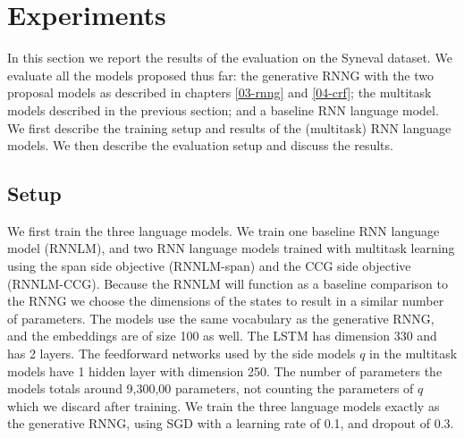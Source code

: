 
\section{Experiments}
  In this section we report the results of the evaluation on the Syneval dataset. We evaluate all the models proposed thus far: the generative RNNG with the two proposal models as described in chapters \ref{03-rnng} and \ref{04-crf}; the multitask models described in the previous section; and a baseline RNN language model. We first describe the training setup and results of the (multitask) RNN language models. We then describe the evaluation setup and discuss the results.

  \subsection{Setup}
    We first train the three language models. We train one baseline RNN language model (RNNLM), and two RNN language models trained with multitask learning using the span side objective (RNNLM-span) and the CCG side objective (RNNLM-CCG). Because the RNNLM will function as a baseline comparison to the RNNG we choose the dimensions of the states to result in a similar number of parameters. The models use the same vocabulary as the generative RNNG, and the embeddings are of size 100 as well. The LSTM has dimension 330 and has 2 layers. The feedforward networks used by the side models $q$ in the multitask models have 1 hidden layer with dimension 250. The number of parameters the models totals around 9,300,00 parameters, not counting the parameters of $q$ which we discard after training. We train the three language models exactly as the generative RNNG, using SGD with a learning rate of 0.1, and dropout of 0.3.

